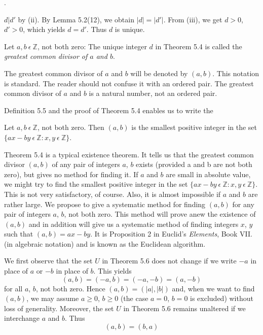 \documentclass[11pt]{amsbook}
\begin{document}
.

$ d | d' $ by (ii). By Lemma 5.2(12), we obtain $|d| = |d'|$. From (iii), we get $ d > 0 $, $d' > 0$, which yields $d = d'$. Thus $d$ is unique.

\begin{defn}
Let $ a,b \ \epsilon \ \mathbb{Z}$, not both zero: The unique integer $d$ in Theorem 5.4 is called the \emph{greatest common divisor of $a$ and $b$}.


The greatest common divisor of $a$ and $b$ will be denoted by $(a ,b)$. This notation is standard. The reader should not confuse it with an ordered pair. The greatest common divisor of $a$ and $b$ is a natural number, not an ordered pair.


Definition 5.5 and the proof of Theorem 5.4 enables us to write the
\end{defn}

\begin{thm} Let $ a,b \ \epsilon \ \mathbb{Z}$, not both zero. Then $(a,b)$ is the smallest positive integer in the set $\{ ax - by \ \epsilon \ \mathbb{Z}: x,y \ \epsilon \ \mathbb{Z}\}$.
\end{thm}


Theorem 5.4 is a typical existence theorem. It tells us that the greatest common divisor $(a,b)$ of any pair of integers $a$, $b$ exists (provided a and b are not both zero), but gives no method for finding it. If $a$ and $b$ are small in absolute value, we might try to find the smallest positive integer in the set $\{ ax - by \ \epsilon \ \mathbb{Z}: x,y \ \epsilon \ \mathbb{Z} \}$. This is not very satisfactory, of course. Also, it is almost impossible if $a$ and $b$ are rather large. We propose to give a systematic method for finding $(a, b)$ for any pair of integers $a$, $b$, not both zero. This method will prove anew the existence of $(a,b)$ and in addition will give us a systematic method of finding integers $x$, $y$ such that $(a,b) = ax - by$. It is Proposition 2 in Euclid's \emph{Elements}, Book
VII. (in algebraic notation) and is known as the Euclidean algorithm.


We first observe that the set $U$ in Theorem 5.6 does not change if we write $-a$ in place of $a$ or $-b$ in place of $b$. This yields
\[
    (a,b) = (-a,b) = (-a,-b) = (a,-b)
\]
for all $a$, $b$, not both zero. Hence $(a,b) = (|a|,|b|)$ and, when we want to find $(a, b)$, we may assume $a \geq 0$, $b \geq 0$ (the case $a = 0$, $b = 0$ is excluded) without loss of generality. Moreover, the set $U$ in Theorem 5.6 remains unaltered if we interchange $a$ and $b$. Thus
\[
(a,b) = (b,a)
\]    
\end{document}
